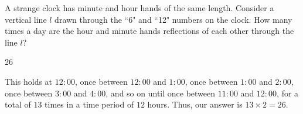 \documentclass[11pt]{article}
\begin{document}
\begin{problem}
A strange clock has minute and hour hands of the same length. Consider a vertical line $l$ drawn through the ``6" and ``12" numbers on the clock.
How many times a day are the hour and minute hands reflections of each other through the line $l$?
\end{problem}

\begin{answer}
26
\end{answer}

\begin{solution}
This holds at $12:00$, once between $12:00$ and $1:00$, once between $1:00$ and $2:00$, once between $3:00$ and $4:00$, and so on until once between $11:00$ and $12:00$, for a total of $13$ times in a time period of $12$ hours. Thus, our answer is $13 \times 2 = \boxed{26}$.
\end{solution}
\end{document}
